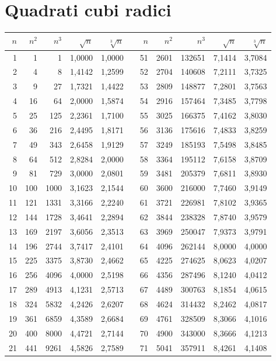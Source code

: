
\section{Quadrati cubi radici}
\label{sec:Tabellaquadraticubiradici}
\begin{longtable}{rrrrrrrrrrr} 
	\toprule
	\bfseries $n$ &  $n^2$ & $n^3$&$\sqrt{n}$&$\sqrt[3]{n}$& &$n$ &  $n^2$ & $n^3$&$\sqrt{n}$&$\sqrt[3]{n}$  \\
	\midrule \endhead
	\bottomrule \endfoot\index{Tabella!quadrati}\index{Tabella!cubi}\index{Tabella!radici}
1&1&1&1,0000&1,0000&&51&2601&132651&7,1414&3,7084\\
2&4&8&1,4142&1,2599&&52&2704&140608&7,2111&3,7325\\
3&9&27&1,7321&1,4422&&53&2809&148877&7,2801&3,7563\\
4&16&64&2,0000&1,5874&&54&2916&157464&7,3485&3,7798\\
5&25&125&2,2361&1,7100&&55&3025&166375&7,4162&3,8030\\
6&36&216&2,4495&1,8171&&56&3136&175616&7,4833&3,8259\\
7&49&343&2,6458&1,9129&&57&3249&185193&7,5498&3,8485\\
8&64&512&2,8284&2,0000&&58&3364&195112&7,6158&3,8709\\
9&81&729&3,0000&2,0801&&59&3481&205379&7,6811&3,8930\\
10&100&1000&3,1623&2,1544&&60&3600&216000&7,7460&3,9149\\
11&121&1331&3,3166&2,2240&&61&3721&226981&7,8102&3,9365\\
12&144&1728&3,4641&2,2894&&62&3844&238328&7,8740&3,9579\\
13&169&2197&3,6056&2,3513&&63&3969&250047&7,9373&3,9791\\
14&196&2744&3,7417&2,4101&&64&4096&262144&8,0000&4,0000\\
15&225&3375&3,8730&2,4662&&65&4225&274625&8,0623&4,0207\\
16&256&4096&4,0000&2,5198&&66&4356&287496&8,1240&4,0412\\
17&289&4913&4,1231&2,5713&&67&4489&300763&8,1854&4,0615\\
18&324&5832&4,2426&2,6207&&68&4624&314432&8,2462&4,0817\\
19&361&6859&4,3589&2,6684&&69&4761&328509&8,3066&4,1016\\
20&400&8000&4,4721&2,7144&&70&4900&343000&8,3666&4,1213\\
21&441&9261&4,5826&2,7589&&71&5041&357911&8,4261&4,1408\\

\end{longtable}
